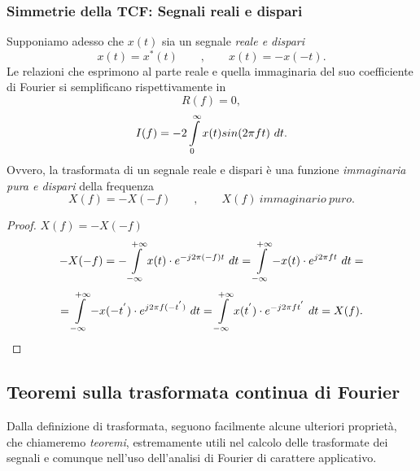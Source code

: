 \documentclass[12pt,oneside,openany]{memoir}
\numberwithin{equation}{subsection}
\newcommand{\dt}{\ dt}
\begin{document}
\subsubsection{Simmetrie della TCF: Segnali reali e dispari}
Supponiamo adesso che $x(t)$ sia un segnale \textit{reale e dispari}
\[
	x(t) = x^*(t) \quad\quad , \quad\quad x(t) = -x(-t).
\]
Le relazioni che esprimono al parte reale e quella immaginaria del suo
coefficiente di Fourier si semplificano rispettivamente in
\[
	R(f) = 0,
\]
\[
	I(f) = -2 \int\displaylimits_{0}^{\infty} x(t) sin(2 \pi f t) \dt.
\]
Ovvero, la trasformata di un segnale reale e dispari \`e una funzione
\textit{immaginaria pura e dispari} della frequenza
\[
	X(f) = -X(-f) \quad\quad , \quad\quad X(f) \ immaginario \ puro.
\]
\begin{proof}
$X(f) = -X(-f)$
\[
	-X(-f) = -\int\displaylimits_{-\infty}^{+\infty} x(t) \cdot
	e^{-j 2 \pi (-f) t} \dt = \int\displaylimits_{-\infty}^{+\infty} -x(t)
	\cdot e^{j 2 \pi f t} \dt =
\]
\[
	= \int\displaylimits_{-\infty}^{+\infty} -x(-t^{'}) \cdot
	e^{j 2 \pi f (-t^{'})} \dt = \int\displaylimits_{-\infty}^{+\infty}
	x(t^{'}) \cdot e^{-j 2 \pi f t^{'}} \dt = X(f).
\]
\end{proof}


\newpage
\subsection{Teoremi sulla trasformata continua di Fourier}
Dalla definizione di trasformata, seguono facilmente alcune ulteriori
propriet\`a, che chiameremo \textit{teoremi}, estremamente utili nel calcolo
delle trasformate dei segnali e comunque nell'uso dell'analisi di Fourier di
carattere applicativo.

\end{document}
